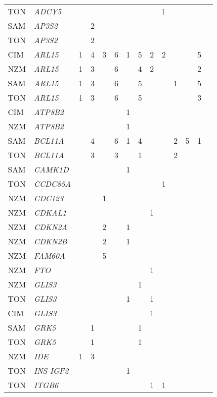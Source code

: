 \documentclass[twoside,openright]{report}
\begin{document}
\begin{ThreePartTable}
\begin{longtable}[t]{llllllllllllll}
TON & \em{ADCY5} &  &  &  &  &  &  &  & 1 &  &  &  & \\
SAM & \em{AP3S2} &  & 2 &  &  &  &  &  &  &  &  &  & \\
TON & \em{AP3S2} &  & 2 &  &  &  &  &  &  &  &  &  & \\
CIM & \em{ARL15} & 1 & 4 & 3 & 6 & 1 & 5 & 2 & 2 &  &  & 5 & \\
NZM & \em{ARL15} & 1 & 3 &  & 6 &  & 4 & 2 &  &  &  & 2 & \\
SAM & \em{ARL15} & 1 & 3 &  & 6 &  & 5 &  &  & 1 &  & 5 & \\
TON & \em{ARL15} & 1 & 3 &  & 6 &  & 5 &  &  &  &  & 3 & \\
CIM & \em{ATP8B2} &  &  &  &  & 1 &  &  &  &  &  &  & \\
NZM & \em{ATP8B2} &  &  &  &  & 1 &  &  &  &  &  &  & \\
SAM & \em{BCL11A} &  & 4 &  & 6 & 1 & 4 &  &  & 2 & 5 & 1 & \\
TON & \em{BCL11A} &  & 3 &  & 3 &  & 1 &  &  & 2 &  &  & \\
SAM & \em{CAMK1D} &  &  &  &  & 1 &  &  &  &  &  &  & \\
TON & \em{CCDC85A} &  &  &  &  &  &  &  & 1 &  &  &  & \\
NZM & \em{CDC123} &  &  & 1 &  &  &  &  &  &  &  &  & \\
NZM & \em{CDKAL1} &  &  &  &  &  &  & 1 &  &  &  &  & \\
NZM & \em{CDKN2A} &  &  & 2 &  & 1 &  &  &  &  &  &  & \\
NZM & \em{CDKN2B} &  &  & 2 &  & 1 &  &  &  &  &  &  & \\
NZM & \em{FAM60A} &  &  & 5 &  &  &  &  &  &  &  &  & \\
NZM & \em{FTO} &  &  &  &  &  &  & 1 &  &  &  &  & \\
NZM & \em{GLIS3} &  &  &  &  &  & 1 &  &  &  &  &  & \\
TON & \em{GLIS3} &  &  &  &  & 1 &  & 1 &  &  &  &  & \\
CIM & \em{GLIS3} &  &  &  &  &  &  & 1 &  &  &  &  & \\
SAM & \em{GRK5} &  & 1 &  &  &  & 1 &  &  &  &  &  & \\
TON & \em{GRK5} &  & 1 &  &  &  & 1 &  &  &  &  &  & \\
NZM & \em{IDE} & 1 & 3 &  &  &  &  &  &  &  &  &  & \\
TON & \em{INS-IGF2} &  &  &  &  & 1 &  &  &  &  &  &  & \\
TON & \em{ITGB6} &  &  &  &  &  &  & 1 & 1 &  &  &  & \\

\end{longtable}
\end{ThreePartTable}
\end{document}
